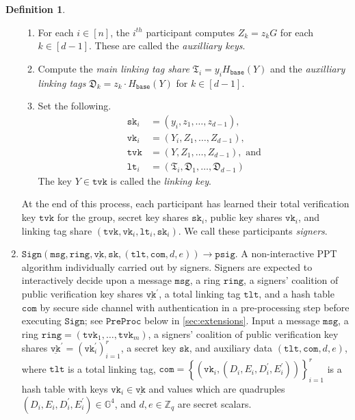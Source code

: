 \documentclass[11pt]{article}
\theoremstyle{definition}
\newtheorem{definition}[definition]{Definition}
\newcommand{\G}{\mathbb{G}}
\newcommand{\sk}{\texttt{sk}}
\newcommand{\vk}{\texttt{vk}}
\newcommand{\lt}{\texttt{lt}}
\newcommand{\tlt}{\texttt{tlt}}
\newcommand{\tvk}{\texttt{tvk}}
\newcommand{\ring}{\texttt{ring}}
\newcommand{\VK}{\underline{\texttt{vk}}}
\newcommand{\psig}{\texttt{psig}}
\newcommand{\com}{\texttt{com}}
\newcommand{\Zq}{\mathbb{Z}_q}
\newcommand{\msg}{\texttt{msg}}
\newcommand{\preproc}{\texttt{PreProc}}
\newcommand{\sign}{\texttt{Sign}}
\begin{document}
\begin{definition}
\begin{enumerate}
\begin{enumerate}
\item For each $i \in [n]$, the $i^{th}$ participant computes $Z_k = z_k G$ for each $k \in [d-1]$. These are called the \textit{auxilliary keys}.
\item Compute the \textit{main linking tag share} $\mathfrak{T}_i = y_i H_{\texttt{base}}(Y)$ and the \textit{auxilliary linking tags} $\mathfrak{D}_k = z_k \cdot H_{\texttt{base}}(Y)$ for $k \in [d-1]$.
\item Set the following.
\begin{align*}
\sk_i &= (y_i, z_1, \ldots, z_{d-1}), \\
\vk_i &= (Y_i, Z_1, \ldots, Z_{d-1}), \\
\tvk &= (Y, Z_1, \ldots, Z_{d-1}),\text{ and}\\
\lt_i &= (\mathfrak{T}_i, \mathfrak{D}_1, \ldots, \mathfrak{D}_{d-1})
\end{align*}
The key $Y \in \tvk$ is called the \textit{linking key}. 
\end{enumerate}
At the end of this process, each participant has learned their total verification key $\tvk$ for the group, secret key shares $\sk_i$, public key shares $\vk_i$, and linking tag share $(\tvk, \vk_i, \lt_i, \sk_i)$. We call these participants \textit{signers}.


\item $\sign(\msg, \ring, \VK,  \sk, (\tlt, \texttt{com}, d, e)) \to \psig$. 
A non-interactive PPT algorithm individually carried out by signers. Signers are expected to interactively decide upon a message $\msg$, a ring $\ring$, a signers' coalition of public verification key shares $\VK^\prime$, a total linking tag $\tlt$, and a hash table $\texttt{com}$ by secure side channel with authentication in a pre-processing step before executing $\sign$; see $\preproc$ below in \cref{sec:extensions}. Input a message $\msg$, a ring $\ring = (\tvk_1, \ldots, \tvk_m)$, a signers' coalition of public verification key shares $\VK^\prime = (\vk_i^\prime)_{i=1}^{r}$, a secret key $\sk$, and auxiliary data $(\tlt, \texttt{com}, d, e)$, where $\tlt$ is a total linking tag, $\com = \left\{(\vk_i, (D_i, E_i, D_i^\prime, E_i^\prime))\right\}_{i=1}^{r}$ is a hash table with keys $\vk_i \in \VK$ and values which are quadruples $(D_i, E_i, D^\prime_i, E^\prime_i) \in \G^4$, and $d, e \in \Zq$ are secret scalars.


\end{enumerate}
\end{definition}
\end{document}
